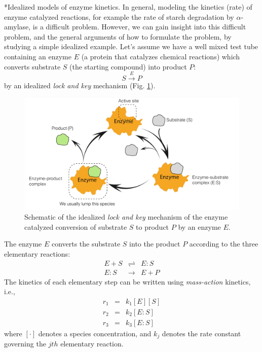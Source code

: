 \documentclass[11pt]{article}
\makeatletter
\theoremstyle{definition}
\renewcommand\subsection{\@startsection
	{subsection}{2}{0mm}
	{-0.05in}
	{-0.5\baselineskip}
	{\normalfont\normalsize\bfseries}}
\makeatother
\begin{document}
\subsection*{Idealized models of enzyme kinetics.}
In general, modeling the kinetics (rate) of enzyme catalyzed reactions, for example the rate of starch degradation by $\alpha$-amylase, is a difficult problem.
However, we can gain insight into this difficult problem, and the general arguments of how to formulate the problem, by studying a simple idealized example.
Let's assume we have a well mixed test tube containing an enzyme $E$ (a protein that catalyzes chemical reactions) which converts substrate $S$ (the starting compound)
into product $P$:
\begin{equation}
S\stackrel{E}\longrightarrow{P}
\end{equation}
by an idealized \textit{lock and key} mechanism (Fig. \ref{fig-mechanism}).
\begin{figure}[!h]\centering
\includegraphics[width=1.0\textwidth]{./figs/EnzymeKinetics.pdf}
\caption{Schematic of the idealized \textit{lock and key} mechanism of the enzyme catalyzed conversion of substrate $S$ to product $P$ by an enzyme $E$. }\label{fig-mechanism}
\end{figure}
The enzyme $E$ converts the substrate $S$ into the product $P$ according to the three elementary reactions:
\begin{eqnarray}
	E+S&\rightleftharpoons&{E:S}\\
	{E:S}&\longrightarrow&E+P
\end{eqnarray}
The kinetics of each elementary step can be written using \emph{mass-action} kinetics, i.e.,
\begin{eqnarray}
	r_{1} & = & k_{1}\left[E\right]\left[S\right]\\
	r_{2} & = & k_{2}\left[E:S\right]\\
	r_{3} & = & k_{3}\left[E:S\right]
\end{eqnarray}where $\left[\cdot\right]$ denotes a species concentration, and $k_{j}$ denotes the rate constant governing the $jth$ elementary reaction.
\end{document}
